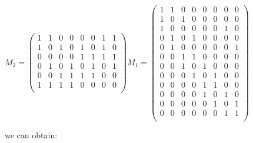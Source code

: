 $M_2 =
\begin{pmatrix}
1 & 1 & 0 & 0 & 0 & 0 & 1 & 1\\
1 & 0 & 1 & 0 & 1 & 0 & 1 & 0\\
0 & 0 & 0 & 0 & 1 & 1 & 1 & 1\\
0 & 1 & 0 & 1 & 0 & 1 & 0 & 1\\
0 & 0 & 1 & 1 & 1 & 1 & 0 & 0\\
1 & 1 & 1 & 1 & 0 & 0 & 0 & 0\\
\end{pmatrix}
M_1 =
\begin{pmatrix}
1 & 1 & 0 & 0 & 0 & 0 & 0 & 0\\
1 & 0 & 1 & 0 & 0 & 0 & 0 & 0\\
1 & 0 & 0 & 0 & 0 & 0 & 1 & 0\\
0 & 1 & 0 & 1 & 0 & 0 & 0 & 0\\
0 & 1 & 0 & 0 & 0 & 0 & 0 & 1\\
0 & 0 & 1 & 1 & 0 & 0 & 0 & 0\\
0 & 0 & 1 & 0 & 1 & 0 & 0 & 0\\
0 & 0 & 0 & 1 & 0 & 1 & 0 & 0\\
0 & 0 & 0 & 0 & 1 & 1 & 0 & 0\\
0 & 0 & 0 & 0 & 1 & 0 & 1 & 0\\
0 & 0 & 0 & 0 & 0 & 1 & 0 & 1\\
0 & 0 & 0 & 0 & 0 & 0 & 1 & 1\\
\end{pmatrix}$

we can obtain:

